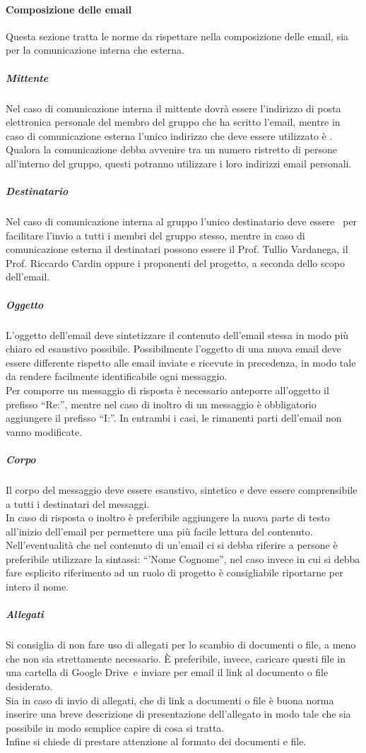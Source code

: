 \documentclass[../NormeProgetto.tex]{subfiles}
\begin{document}
		\paragraph{Composizione delle email}
			Questa sezione tratta le norme da rispettare nella composizione delle email, sia per la comunicazione interna che esterna.
			\subparagraph{Mittente}
				Nel caso di comunicazione interna il mittente dovrà essere l'indirizzo di posta elettronica personale del membro del gruppo che ha scritto l'email, mentre in caso di comunicazione esterna l'unico indirizzo che deve essere utilizzato è \mailleaf. \\ Qualora la comunicazione debba avvenire tra un numero ristretto di persone all'interno del gruppo, questi potranno utilizzare i loro indirizzi email personali.
			\subparagraph{Destinatario}
				Nel caso di comunicazione interna al gruppo l'unico destinatario deve essere \mailleaf\ per facilitare l'invio a tutti i membri del gruppo stesso, mentre in caso di comunicazione esterna il destinatari possono essere il Prof. Tullio Vardanega, il Prof. Riccardo Cardin oppure i proponenti del progetto, a seconda dello scopo dell'email.
			\subparagraph{Oggetto}
				L'oggetto dell'email deve sintetizzare il contenuto dell'email stessa in modo più chiaro ed esaustivo possibile. Possibilmente l'oggetto di una nuova email deve essere differente rispetto alle email inviate e ricevute in precedenza, in modo tale da rendere facilmente identificabile ogni messaggio. \\ Per comporre un messaggio di risposta è necessario anteporre all'oggetto il prefisso ``Re:'', mentre nel caso di inoltro di un messaggio è obbligatorio aggiungere il prefisso ``I:''. In entrambi i casi, le rimanenti parti dell'email non vanno modificate.
			\subparagraph{Corpo}
				Il corpo del messaggio deve essere esaustivo, sintetico e deve essere comprensibile a tutti i destinatari del messaggi. \\ In caso di risposta o inoltro è preferibile aggiungere la nuova parte di testo all'inizio dell'email per permettere una più facile lettura del contenuto. \\ Nell'eventualità che nel contenuto di un'email ci si debba riferire a persone è preferibile utilizzare la sintassi: ``'Nome Cognome'', nel caso invece in cui si debba fare esplicito riferimento ad un ruolo di progetto è consigliabile riportarne per intero il nome.
			\subparagraph{Allegati}
				Si consiglia di non fare uso di allegati per lo scambio di documenti o file, a meno che non sia strettamente necessario. È preferibile, invece, caricare questi file in una cartella di Google Drive\g\ e inviare per email il link al documento o file desiderato. \\ Sia in caso di invio di allegati, che di link a documenti o file è buona norma inserire una breve descrizione di presentazione dell'allegato in modo tale che sia possibile in modo semplice capire di cosa si tratta. \\ Infine si chiede di prestare attenzione al formato dei documenti e file.
\end{document}

